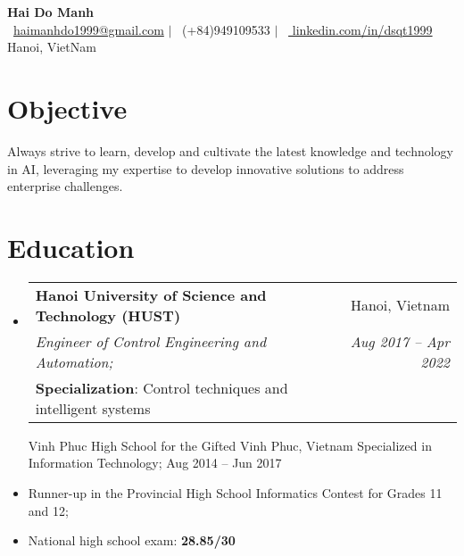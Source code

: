 \documentclass[letterpaper,11pt]{article}
\makeatletter
\newcommand{\resumeItem}[1]{
  \item\small{
    {#1 \vspace{-2pt}}
  }
}
\newcommand{\resumeSubheadingedu}[6]{
  \vspace{-2pt}\item
    \begin{tabular*}{1.0\textwidth}[t]{l@{\extracolsep{\fill}}r}
      \textbf{#1} & \small #2 \\
      \textit{\small#3} & \textit{\small #4} \\
      \small#5 & \textbf{\small #6} \\
      
    \end{tabular*}\vspace{-7pt}
}
\newcommand{\resumeSubheading}[4]{
  \vspace{-2pt}\item
    \begin{tabular*}{1.0\textwidth}[t]{l@{\extracolsep{\fill}}r}
      \textbf{#1} & \small #2 \\
      \textit{\small#3} & \textit{\small #4} \\
      
    \end{tabular*}\vspace{-7pt}
}
\newcommand{\resumeSubHeadingListStart}{\begin{itemize}[leftmargin=0.0in, label={}]}
\newcommand{\resumeSubHeadingListEnd}{\end{itemize}}
\makeatother
\begin{document}

\begin{center}
    {\Huge \textbf{Hai Do Manh}} \\ \vspace{1pt}
    \vspace{5pt}
    \small \raisebox{-0.2\height}\faEnvelope\ \href{mailto:haimanhdo1999@gmail.com}{haimanhdo1999@gmail.com} $|$ 
    \raisebox{-0.1\height}\faPhone\ (+84)949109533 $|$ 
    \raisebox{-0.2\height}\faLinkedin\ \href{https://www.linkedin.com/in/dsqt1999/}{ linkedin.com/in/dsqt1999}  ~
    \newline   
    \small Hanoi, VietNam 
    \vspace{-10pt}
    
\end{center}

\section{Objective}
  \resumeSubHeadingListStart
    \resumeSubheadingobj
      {Always strive to learn, develop and cultivate the latest knowledge and technology in AI, leveraging my expertise to develop innovative solutions to address enterprise challenges.}
     \resumeSubHeadingListEnd

\section{Education}
  \resumeSubHeadingListStart
    \resumeSubheadingedu
      {Hanoi University of Science and Technology (HUST)}{Hanoi, Vietnam}
      {Engineer of Control Engineering and Automation;}{Aug 2017 -- Apr 2022} 
      {\textbf{Specialization}: Control techniques and intelligent systems}

    \resumeSubheading
      {Vinh Phuc High School for the Gifted} {Vinh Phuc, Vietnam}
      {Specialized in Information Technology;} {Aug 2014 – Jun 2017}
      \resumeItem{Runner-up in the Provincial High School Informatics Contest for Grades 11 and 12;}
      \resumeItem{National high school exam: \textbf{28.85/30}} 
     \resumeSubHeadingListEnd
\end{document}
